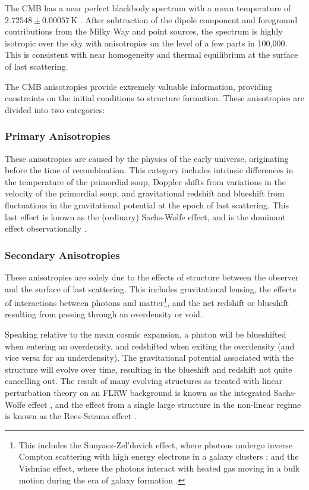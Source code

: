 \documentclass[a4paper,12pt]{report}
\begin{document}
The CMB has a near perfect blackbody spectrum with a mean temperature of $2.72548 \pm 0.00057\,$K \cite{RN70}. After subtraction of the dipole component and foreground contributions from the Milky Way and point sources, the spectrum is highly isotropic over the sky with anisotropies on the level of a few parts in 100,000. This is consistent with near homogeneity and thermal equilibrium at the surface of last scattering.

The CMB anisotropies provide extremely valuable information, providing constraints on the initial conditions to structure formation. These anisotropies are divided into two categories:

\subsubsection{Primary Anisotropies}
These anisotropies are caused by the physics of the early universe, originating before the time of recombination. This category includes intrinsic differences in the temperature of the primordial soup, Doppler shifts from variations in the velocity of the primordial soup, and gravitational redshift and blueshift from fluctuations in the gravitational potential at the epoch of last scattering. This last effect is known as the (ordinary) Sachs-Wolfe effect, and is the dominant effect observationally \cite{RN46}.

\subsubsection{Secondary Anisotropies}
These anisotropies are solely due to the effects of structure between the observer and the surface of last scattering. This includes gravitational lensing, the effects of interactions between photons and matter\footnote{This includes the Sunyaez-Zel'dovich effect, where photons undergo inverse Compton scattering with high energy electrons in a galaxy clusters \cite{RN159,RN161}; and the Vishniac effect, where the photons interact with heated gas moving in a bulk motion during the era of galaxy formation \cite{RN162}.}, and the net redshift or blueshift resulting from passing through an overdensity or void.

Speaking relative to the mean cosmic expansion, a photon will be blueshifted when entering an overdensity, and redshifted when exiting the overdensity (and vice versa for an underdensity). The gravitational potential associated with the structure will evolve over time, resulting in the blueshift and redshift not quite cancelling out. The result of many evolving structures as treated with linear perturbation theory on an FLRW background is known as the integrated Sachs-Wolfe effect \cite{RN46}, and the effect from a single large structure in the non-linear regime is known as the Rees-Sciama effect \cite{RN45}.
\end{document}
